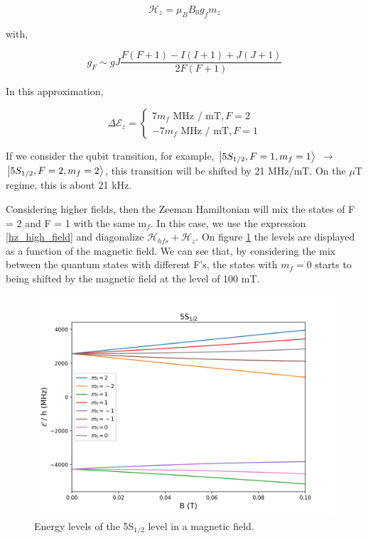 \documentclass[
10pt, %
a4paper, %
oneside, %
headinclude,footinclude, %
BCOR5mm, %
]{scrartcl}
\begin{document}
\begin{equation}
    \mathcal{H}_{z} = \mu_{B}B_{0} g_{f} m_{z}
\end{equation}

with,

\begin{equation}
    g_{F} \sim g{J} \frac{F(F+1) - I(I+1) + J(J+1)}{2F(F+1)}
\end{equation}

In this approximation, 

$$
\Delta\mathcal{E}_{z} = \left\{
    \begin{array}{ll}
        7 m_{f} \textrm{ MHz / mT}, F = 2 \\
        - 7 m_{f} \textrm{ MHz / mT}, F = 1
    \end{array}
\right.
$$

If we consider the qubit transition, for example, $\ket{5S_{1/2}, F=1, m_{f}=1}$ $\rightarrow$ $\ket{5S_{1/2}, F=2, m_{f}=2}$, this transition will be shifted by 21 MHz/mT. On the $\mu$T regime, this is about 21 kHz. 

Considering higher fields, then the Zeeman Hamiltonian will mix the states of F = 2 and F = 1 with the same m$_{f}$. In this case, we use the expression \ref{hz_high_field} and diagonalize $\mathcal{H}_{hfs} + \mathcal{H}_{z}$. On figure \ref{ZeemanShift_5S} the levels are displayed as a function of the magnetic field. We can see that, by considering the mix between the quantum states with different F's, the states with $m_{f} = 0$ starts to being shifted by the magnetic field at the level of 100 mT.

\begin{figure}[t]
    \includegraphics[width=\linewidth]{Zeeman_shift}
    \centering
    \caption{Energy levels of the 5S$_{1/2}$ level in a magnetic field.}
    \label{ZeemanShift_5S}
\end{figure}
\end{document}

